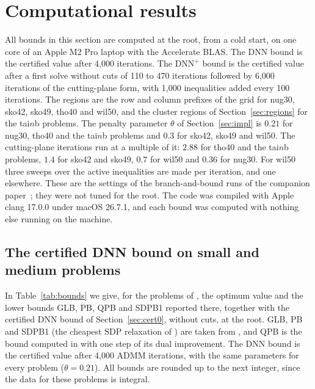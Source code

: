 \documentclass[11pt]{article}
\theoremstyle{remark}
\newcommand{\DNNp}{\mathrm{DNN}^{+}}
\begin{document}
\section{Computational results}\label{sec:results}

All bounds in this section are computed at the root, from a cold start, on one
core of an Apple M2 Pro laptop with the Accelerate BLAS. The DNN bound is the certified value
after 4,000 iterations. The $\DNNp$ bound is the certified value after a first
solve without cuts of 110 to 470 iterations followed by 6,000 iterations of the
cutting-plane form, with 1,000 inequalities added every 100 iterations. The
regions are the row and column prefixes of the grid for nug30, sko42, sko49,
tho40 and wil50, and the cluster regions of Section~\ref{sec:regions} for the
tai$n$b problems. The penalty parameter $\theta$ of Section~\ref{sec:impl} is $0.21$ for nug30, tho40 and the
tai$n$b problems and $0.3$ for sko42, sko49 and wil50. The cutting-plane
iterations run at a multiple of it: $2.88$ for tho40 and the tai$n$b problems,
$1.4$ for sko42 and sko49, $0.7$ for wil50 and $0.36$ for nug30. For wil50
three sweeps over the active inequalities are made per iteration, and one
elsewhere. These are the settings of the branch-and-bound runs of the
companion paper~\cite{companion}; they were not tuned for the root.
The code was compiled with Apple clang 17.0.0 under macOS 26.7.1, and each
bound was computed with nothing else running on the machine.

\subsection{The certified DNN bound on small and medium problems}

In Table~\ref{tab:bounds} we give, for the problems of \cite[Table~1]{ab01}, the
optimum value and the lower bounds GLB, PB, QPB and SDPB1 reported there, together
with the certified DNN bound of Section~\ref{sec:cert0}, without cuts, at the
root. GLB, PB and SDPB1 (the cheapest SDP relaxation of \cite{zkrw}) are taken
from \cite{zkrw}, and QPB is the bound computed in \cite{ab01} with one step of
its dual improvement. The DNN bound is the certified value after 4,000 ADMM
iterations, with the same parameters for every problem ($\theta = 0.21$).
All bounds are rounded up to the next integer, since the data for these problems
is integral.
\end{document}

